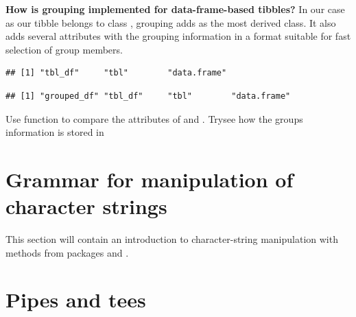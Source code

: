 \documentclass[krantz2]{krantz}\usepackage{knitr}%
\begin{document}
\begin{explainbox}
\textbf{How is grouping implemented for data-frame-based tibbles?} In our case as our tibble belongs to class , grouping adds  as the most derived class. It also adds several attributes with the grouping information in a format suitable for fast selection of group members.

\begin{knitrout}\footnotesize
{}\color{fgcolor}\begin{kframe}
\begin{alltt}
 \hlkwb{<-} \hlstd{(} \hlstd{=} \hlopt{:}\hlstd{,}  \hlstd{=} \hlstd{(letters[}\hlopt{:}\hlstd{],} \hlstd{))}
\end{alltt}
\begin{verbatim}
## [1] "tbl_df"     "tbl"        "data.frame"
\end{verbatim}
\begin{alltt}
 \hlkwb{<-} 
\end{alltt}
\begin{verbatim}
## [1] "grouped_df" "tbl_df"     "tbl"        "data.frame"
\end{verbatim}
\end{kframe}
\end{knitrout}

\begin{playground}
Use function  to compare the attributes of   and . Trysee how the groups information is stored in
\end{playground}
\end{explainbox}

\section{Grammar for manipulation of character strings}\label{sec:data:strings}

\begin{warningbox}
  This section will contain an introduction to character-string manipulation with methods from packages  and .
\end{warningbox}

\section{Pipes and tees}\label{sec:data:pipes}
\end{document}

